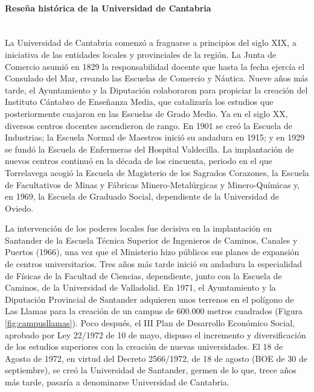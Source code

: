 \paragraph{Reseña histórica de la Universidad de Cantabria\\\\}

La Universidad de Cantabria comenzó a fraguarse a principios del siglo XIX, a iniciativa de las entidades locales y provinciales de la región.  La Junta de Comercio asumió en 1829 la responsabilidad docente que hasta la fecha ejercía el Consulado del Mar, creando las Escuelas de Comercio y Náutica. Nueve años más tarde, el Ayuntamiento y la Diputación colaboraron para propiciar la creación del Instituto Cántabro de Enseñanza Media, que catalizaría los estudios que posteriormente cuajaron en las Escuelas de Grado Medio. Ya en el siglo XX, diversos centros docentes ascendieron de rango. En 1901 se creó la Escuela de Industrias; la Escuela Normal de Maestros inició su andadura en 1915; y en 1929 se fundó la Escuela de Enfermeras del Hospital Valdecilla. La implantación de nuevos centros continuó en la década de los cincuenta, periodo en el que Torrelavega acogió la Escuela de Magisterio de los Sagrados Corazones, la Escuela de Facultativos de Minas y Fábricas Minero-Metalúrgicas y Minero-Químicas y, en 1969, la Escuela de Graduado Social, dependiente de la Universidad de Oviedo.

La intervención de los poderes locales fue decisiva en la implantación en Santander de la Escuela Técnica Superior de Ingenieros de Caminos, Canales y Puertos (1966), una vez que el Ministerio hizo públicos sus planes de expansión de centros universitarios. Tres años más tarde inició su andadura la especialidad de Físicas de la Facultad de Ciencias, dependiente, junto con la Escuela de Caminos, de la Universidad de Valladolid. En 1971, el Ayuntamiento y la Diputación Provincial de Santander adquieren unos terrenos en el polígono de Las Llamas para la creación de un campus de 600.000 metros cuadrados (Figura \ref{fig:campusllamas}). Poco después, el III Plan de Desarrollo Económico Social, aprobado por Ley 22/1972 de 10 de mayo, dispuso el incremento y diversificación de los estudios superiores con la creación de nuevas universidades.  El 18 de Agosto de 1972, en virtud del Decreto 2566/1972, de 18 de agosto (BOE de 30 de septiembre), se creó la Universidad de Santander, germen de lo que, trece años más tarde, pasaría a denominarse Universidad de Cantabria.


